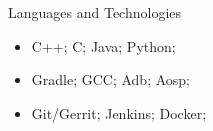 \documentclass[]{mcdowellcv}
\begin{document}
	\begin{cvsection}{Languages and Technologies}
		\begin{cvsubsection}{}{}{}
			\begin{itemize}
				\item C++; C; Java; Python;
				\item Gradle; GCC; Adb; Aosp;
				\item Git/Gerrit; Jenkins; Docker;
			\end{itemize}
		\end{cvsubsection}
	\end{cvsection}
\end{document}
